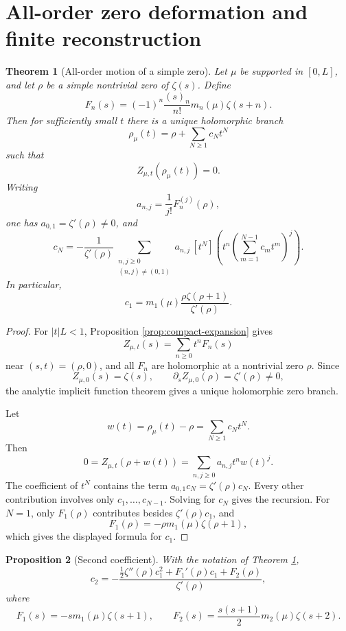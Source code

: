 \documentclass[11pt]{article}
\theoremstyle{plain}
\newtheorem{theorem}{Theorem}[section]
\newtheorem{proposition}[theorem]{Proposition}
\theoremstyle{definition}
\begin{document}
\section{All-order zero deformation and finite reconstruction}

\begin{theorem}[All-order motion of a simple zero]\label{thm:zero-motion}
Let \(\mu\) be supported in \([0,L]\), and let \(\rho\) be a simple nontrivial zero of \(\zeta(s)\).  Define
\[
   F_n(s)=(-1)^n\frac{(s)_n}{n!}m_n(\mu)\zeta(s+n).
\]
Then for sufficiently small \(t\) there is a unique holomorphic branch
\[
   \rho_\mu(t)=\rho+\sum_{N\ge1}c_Nt^N
\]
such that
\[
   Z_{\mu,t}(\rho_\mu(t))=0.
\]
Writing
\[
   a_{n,j}=\frac1{j!}F_n^{(j)}(\rho),
\]
one has \(a_{0,1}=\zeta'(\rho)\ne0\), and
\[
 c_N=-\frac1{\zeta'(\rho)}
 \sum_{\substack{n,j\ge0\\(n,j)\ne(0,1)}}
 a_{n,j}\,[t^N]\left(t^n\left(\sum_{m=1}^{N-1}c_mt^m\right)^j\right).
\]
In particular,
\[
   c_1=m_1(\mu)\frac{\rho\zeta(\rho+1)}{\zeta'(\rho)}.
\]
\end{theorem}

\begin{proof}
For \(|t|L<1\), Proposition \ref{prop:compact-expansion} gives
\[
   Z_{\mu,t}(s)=\sum_{n\ge0}t^nF_n(s)
\]
near \((s,t)=(\rho,0)\), and all \(F_n\) are holomorphic at a nontrivial zero \(\rho\).  Since
\[
   Z_{\mu,0}(s)=\zeta(s),
   \qquad
   \partial_s Z_{\mu,0}(\rho)=\zeta'(\rho)\ne0,
\]
the analytic implicit function theorem gives a unique holomorphic zero branch.

Let
\[
   w(t)=\rho_\mu(t)-\rho=\sum_{N\ge1}c_Nt^N.
\]
Then
\[
   0=Z_{\mu,t}(\rho+w(t))=\sum_{n,j\ge0}a_{n,j}t^n w(t)^j.
\]
The coefficient of \(t^N\) contains the term \(a_{0,1}c_N=\zeta'(\rho)c_N\).  Every other contribution involves only \(c_1,\ldots,c_{N-1}\).  Solving for \(c_N\) gives the recursion.  For \(N=1\), only \(F_1(\rho)\) contributes besides \(\zeta'(\rho)c_1\), and
\[
   F_1(\rho)=-\rho m_1(\mu)\zeta(\rho+1),
\]
which gives the displayed formula for \(c_1\).
\end{proof}

\begin{proposition}[Second coefficient]\label{prop:second-coeff}
With the notation of Theorem \ref{thm:zero-motion},
\[
   c_2=-\frac{\frac12\zeta''(\rho)c_1^2+F_1'(\rho)c_1+F_2(\rho)}{\zeta'(\rho)},
\]
where
\[
   F_1(s)=-s m_1(\mu)\zeta(s+1),
   \qquad
   F_2(s)=\frac{s(s+1)}2m_2(\mu)\zeta(s+2).
\]
\end{proposition}
\end{document}
